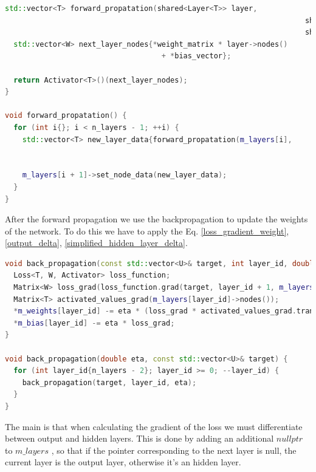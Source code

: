 \documentclass[12pt]{article}
\begin{document}
\begin{lstlisting}[language=C++]
std::vector<T> forward_propatation(shared<Layer<T>> layer,
																	 shared<Matrix<W>> weight_matrix,
																	 shared<std::vector<W>> bias_vector) {
  std::vector<W> next_layer_nodes{*weight_matrix * layer->nodes() 
									+ *bias_vector};

  return Activator<T>()(next_layer_nodes);
}

void forward_propatation() {
  for (int i{}; i < n_layers - 1; ++i) {
    std::vector<T> new_layer_data{forward_propatation(m_layers[i],
																										  m_weights[i],
																										  m_bias[i])};
    m_layers[i + 1]->set_node_data(new_layer_data);
  }
}
\end{lstlisting}
After the forward propagation we use the backpropagation to update the weights of the network. To do this we
have to apply the Eq. \ref{loss_gradient_weight}, \ref{output_delta}, \ref{simplified_hidden_layer_delta}.
\begin{lstlisting}[language=C++]
void back_propagation(const std::vector<U>& target, int layer_id, double eta) {
  Loss<T, W, Activator> loss_function;
  Matrix<W> loss_grad(loss_function.grad(target, layer_id + 1, m_layers, m_weights));
  Matrix<T> activated_values_grad(m_layers[layer_id]->nodes());
  *m_weights[layer_id] -= eta * (loss_grad * activated_values_grad.transpose());
  *m_bias[layer_id] -= eta * loss_grad;
}

void back_propagation(double eta, const std::vector<U>& target) {
  for (int layer_id{n_layers - 2}; layer_id >= 0; --layer_id) {
    back_propagation(target, layer_id, eta);
  }
}
\end{lstlisting}
The main is that when calculating the gradient of the loss we must differentiate between output and hidden 
layers. This is done by adding an additional $nullptr$ to $m\_layers$ , so that if the pointer corresponding
to the next layer is null, the current layer is the output layer, otherwise it's an hidden layer.
\end{document}
